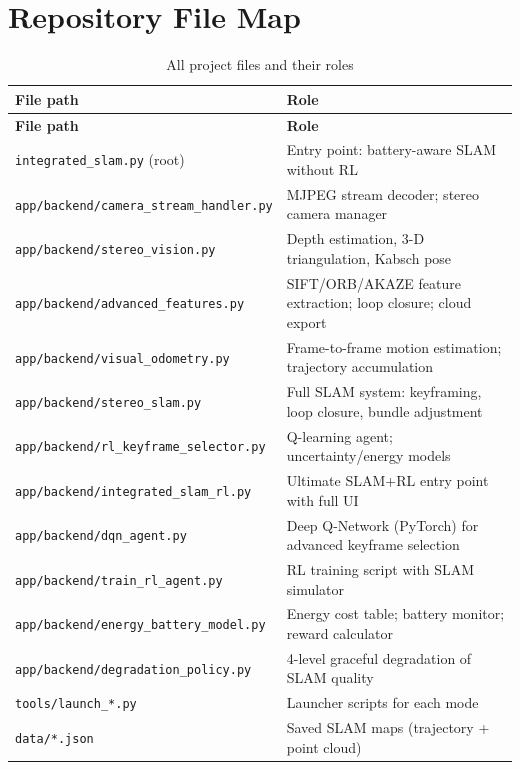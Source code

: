 \documentclass[12pt,a4paper,twoside]{report}
\theoremstyle{definition}
\newcommand{\file}[1]{\texttt{\textcolor{codeblue}{#1}}}
\begin{document}
\section{Repository File Map}

\begin{longtable}{|p{5.5cm}|p{8cm}|}
\caption{All project files and their roles}\label{tab:filemap}\\
\hline
\textbf{File path} & \textbf{Role} \\ \hline
\endfirsthead
\hline
\textbf{File path} & \textbf{Role} \\ \hline
\endhead
\file{integrated\_slam.py} (root) & Entry point: battery-aware SLAM without RL \\ \hline
\file{app/backend/camera\_stream\_handler.py} & MJPEG stream decoder; stereo camera manager \\ \hline
\file{app/backend/stereo\_vision.py} & Depth estimation, 3-D triangulation, Kabsch pose \\ \hline
\file{app/backend/advanced\_features.py} & SIFT/ORB/AKAZE feature extraction; loop closure; cloud export \\ \hline
\file{app/backend/visual\_odometry.py} & Frame-to-frame motion estimation; trajectory accumulation \\ \hline
\file{app/backend/stereo\_slam.py} & Full SLAM system: keyframing, loop closure, bundle adjustment \\ \hline
\file{app/backend/rl\_keyframe\_selector.py} & Q-learning agent; uncertainty/energy models \\ \hline
\file{app/backend/integrated\_slam\_rl.py} & Ultimate SLAM+RL entry point with full UI \\ \hline
\file{app/backend/dqn\_agent.py} & Deep Q-Network (PyTorch) for advanced keyframe selection \\ \hline
\file{app/backend/train\_rl\_agent.py} & RL training script with SLAM simulator \\ \hline
\file{app/backend/energy\_battery\_model.py} & Energy cost table; battery monitor; reward calculator \\ \hline
\file{app/backend/degradation\_policy.py} & 4-level graceful degradation of SLAM quality \\ \hline
\file{tools/launch\_*.py} & Launcher scripts for each mode \\ \hline
\file{data/*.json} & Saved SLAM maps (trajectory + point cloud) \\ \hline
\end{longtable}
\end{document}
